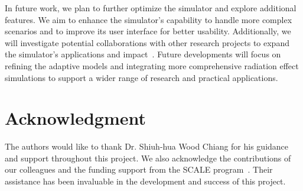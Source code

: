 \documentclass[conference]{IEEEtran}
\begin{document}
    In future work, we plan to further optimize the simulator and explore additional features.
    We aim to enhance the simulator's capability to handle more complex scenarios and to improve its user interface for better usability.
    Additionally, we will investigate potential collaborations with other research projects to expand the simulator's applications and impact~\cite{Pepper1990}.
    Future developments will focus on refining the adaptive models and integrating more comprehensive radiation effect simulations to support a wider range of research and practical applications.

    \section*{Acknowledgment}
    The authors would like to thank Dr. Shiuh-hua Wood Chiang for his guidance and support throughout this project.
    We also acknowledge the contributions of our colleagues and the funding support from the SCALE program~\cite{SCALE}.
    Their assistance has been invaluable in the development and success of this project.

    
    
\end{document}
